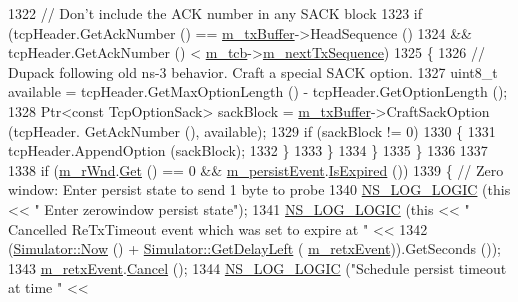 \begin{DoxyCode}
1322           \textcolor{comment}{// Don't include the ACK number in any SACK block}
1323           \textcolor{keywordflow}{if} (tcpHeader.GetAckNumber () == \hyperlink{classns3_1_1TcpSocketBase_a4a1b53982ffd851bd07ab8d5005c130e}{m\_txBuffer}->HeadSequence ()
1324               && tcpHeader.GetAckNumber () < \hyperlink{classns3_1_1TcpSocketBase_a26bbaf59001308dc43fb630d76f2e38b}{m\_tcb}->\hyperlink{classns3_1_1TcpSocketState_ad1f77b1cbdb9267a89ebb6f16ac76892}{m\_nextTxSequence})
1325             \{
1326               \textcolor{comment}{// Dupack following old ns-3 behavior. Craft a special SACK option.}
1327               uint8\_t available = tcpHeader.GetMaxOptionLength () - tcpHeader.GetOptionLength ();
1328               Ptr<const TcpOptionSack> sackBlock = \hyperlink{classns3_1_1TcpSocketBase_a4a1b53982ffd851bd07ab8d5005c130e}{m\_txBuffer}->CraftSackOption (tcpHeader.
      GetAckNumber (), available);
1329               \textcolor{keywordflow}{if} (sackBlock != 0)
1330                 \{
1331                   tcpHeader.AppendOption (sackBlock);
1332                 \}
1333             \}
1334         \}
1335     \}
1336 
1337 
1338   \textcolor{keywordflow}{if} (\hyperlink{classns3_1_1TcpSocketBase_af3fafd1671964e0674677be541e1501a}{m\_rWnd}.\hyperlink{classns3_1_1TracedValue_a10fddd1de961ac65acfbeb440a1e8551}{Get} () == 0 && \hyperlink{classns3_1_1TcpSocketBase_ac9f9af0cce2ec51e89396146e3199b42}{m\_persistEvent}.\hyperlink{classns3_1_1EventId_a5c30c92e7c1c34b4e8505cc07ed71b02}{IsExpired} ())
1339     \{ \textcolor{comment}{// Zero window: Enter persist state to send 1 byte to probe}
1340       \hyperlink{group__logging_ga88acd260151caf2db9c0fc84997f45ce}{NS\_LOG\_LOGIC} (\textcolor{keyword}{this} << \textcolor{stringliteral}{" Enter zerowindow persist state"});
1341       \hyperlink{group__logging_ga88acd260151caf2db9c0fc84997f45ce}{NS\_LOG\_LOGIC} (\textcolor{keyword}{this} << \textcolor{stringliteral}{" Cancelled ReTxTimeout event which was set to expire at "} <<
1342                     (\hyperlink{classns3_1_1Simulator_ac3178fa975b419f7875e7105be122800}{Simulator::Now} () + \hyperlink{classns3_1_1Simulator_af2c7b4285454aa5062bd2df2bb7a7ab9}{Simulator::GetDelayLeft} (
      \hyperlink{classns3_1_1TcpSocketBase_a620dd547e6484bc03c6b796f589b75a6}{m\_retxEvent})).GetSeconds ());
1343       \hyperlink{classns3_1_1TcpSocketBase_a620dd547e6484bc03c6b796f589b75a6}{m\_retxEvent}.\hyperlink{classns3_1_1EventId_a993ae94e48e014e1afd47edb16db7a11}{Cancel} ();
1344       \hyperlink{group__logging_ga88acd260151caf2db9c0fc84997f45ce}{NS\_LOG\_LOGIC} (\textcolor{stringliteral}{"Schedule persist timeout at time "} <<

\end{DoxyCode}
